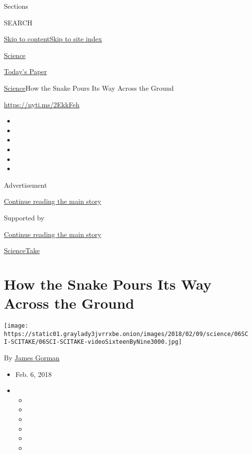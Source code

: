 Sections

SEARCH

\protect\hyperlink{site-content}{Skip to
content}\protect\hyperlink{site-index}{Skip to site index}

\href{https://www.nytimes3xbfgragh.onion/section/science}{Science}

\href{https://myaccount.nytimes3xbfgragh.onion/auth/login?response_type=cookie\&client_id=vi}{}

\href{https://www.nytimes3xbfgragh.onion/section/todayspaper}{Today's
Paper}

\href{/section/science}{Science}\textbar{}How the Snake Pours Its Way
Across the Ground

\url{https://nyti.ms/2EkkFeh}

\begin{itemize}
\item
\item
\item
\item
\item
\item
\end{itemize}

Advertisement

\protect\hyperlink{after-top}{Continue reading the main story}

Supported by

\protect\hyperlink{after-sponsor}{Continue reading the main story}

\href{/column/sciencetake}{ScienceTake}

\hypertarget{how-the-snake-pours-its-way-across-the-ground}{%
\section{How the Snake Pours Its Way Across the
Ground}\label{how-the-snake-pours-its-way-across-the-ground}}

\texttt{[image: https://static01.graylady3jvrrxbe.onion/images/2018/02/09/science/06SCI-SCITAKE/06SCI-SCITAKE-videoSixteenByNine3000.jpg]}

By \href{http://www.nytimes3xbfgragh.onion/by/james-gorman}{James
Gorman}

\begin{itemize}
\item
  Feb. 6, 2018
\item
  \begin{itemize}
  \item
  \item
  \item
  \item
  \item
  \item
  \end{itemize}
\end{itemize}

